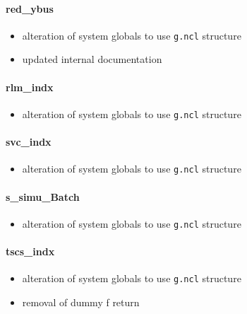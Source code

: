 \documentclass[12pt]{article}
\begin{document}
\paragraph{red\_ybus}
	\begin{itemize}
		\item alteration of system globals to use \verb|g.ncl| structure
		\item updated internal documentation
	\end{itemize}
\paragraph{rlm\_indx}
	\begin{itemize}
		\item alteration of system globals to use \verb|g.ncl| structure
	\end{itemize}

\paragraph{svc\_indx}
	\begin{itemize}
		\item alteration of system globals to use \verb|g.ncl| structure
	\end{itemize}

\paragraph{s\_simu\_Batch}
	\begin{itemize}
		\item alteration of system globals to use \verb|g.ncl| structure
	\end{itemize}

\paragraph{tscs\_indx}
	\begin{itemize}
		\item alteration of system globals to use \verb|g.ncl| structure
		\item removal of dummy f return
	\end{itemize}
\end{document}
